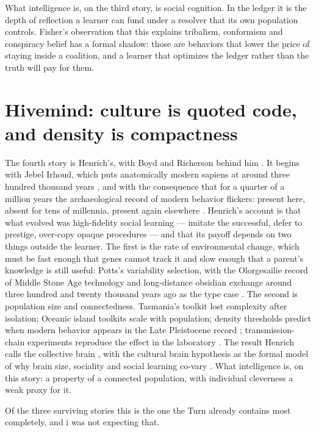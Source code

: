 What intelligence is, on the third story, is social cognition. In the ledger it is the depth of reflection a learner can fund under a resolver that its own population controls. Fisher's observation that this explains tribalism, conformism and conspiracy belief has a formal shadow: those are behaviors that lower the price of staying inside a coalition, and a learner that optimizes the ledger rather than the truth will pay for them.

\section{Hivemind: culture is quoted code, and density is compactness}
\label{st:sec:hivemind}

The fourth story is Henrich's, with Boyd and Richerson behind him \cite{henrich2016,boyd1985,richerson2005,boyd2011}. It begins with Jebel Irhoud, which puts anatomically modern sapiens at around three hundred thousand years \cite{hublin2017}, and with the consequence that for a quarter of a million years the archaeological record of modern behavior flickers: present here, absent for tens of millennia, present again elsewhere \cite{mcbrearty2000}. Henrich's account is that what evolved was high-fidelity social learning --- imitate the successful, defer to prestige, over-copy opaque procedures --- and that its payoff depends on two things outside the learner. The first is the rate of environmental change, which must be fast enough that genes cannot track it and slow enough that a parent's knowledge is still useful: Potts's variability selection, with the Olorgesailie record of Middle Stone Age technology and long-distance obsidian exchange around three hundred and twenty thousand years ago as the type case \cite{potts1998,potts2018}. The second is population size and connectedness. Tasmania's toolkit lost complexity after isolation; Oceanic island toolkits scale with population; density thresholds predict when modern behavior appears in the Late Pleistocene record \cite{henrich2004,kline2010,powell2009}; transmission-chain experiments reproduce the effect in the laboratory \cite{derex2013}. The result Henrich calls the collective brain \cite{muthukrishna2016}, with the cultural brain hypothesis as the formal model of why brain size, sociality and social learning co-vary \cite{muthukrishna2018}. What intelligence is, on this story: a property of a connected population, with individual cleverness a weak proxy for it.

Of the three surviving stories this is the one the Turn already contains most completely, and i was not expecting that.

